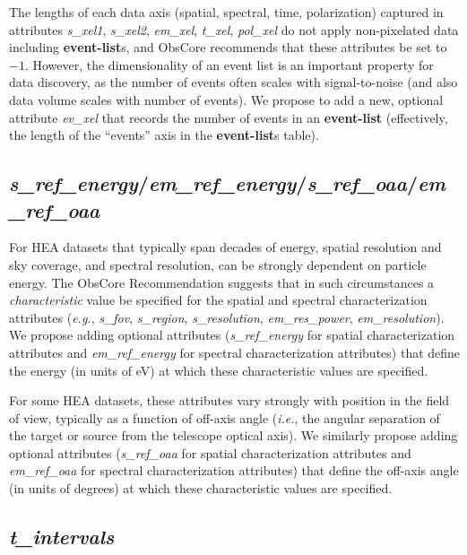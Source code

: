 \documentclass[11pt,a4paper]{ivoa}
\begin{document}
The lengths of each data axis (spatial, spectral, time, polarization) captured in attributes {\em s\_xel1\/}, {\em s\_xel2\/}, {\em em\_xel\/}, {\em t\_xel\/}, {\em pol\_xel\/} do not apply non-pixelated data including {\bf event-list}s, and ObsCore recommends that these attributes be set to $-1$.  However, the dimensionality of an event list is an important property for data discovery, as the number of events often scales with signal-to-noise (and also data volume scales with number of events).  We propose to add a new, optional attribute {\em ev\_xel\/} that records the number of events in an {\bf event-list} (effectively, the length of the ``events'' axis in the {\bf event-list}s table).

\subsection{{\em s\_ref\_energy\/}/{\em em\_ref\_energy\/}/{\em s\_ref\_oaa\/}/{\em em\_ref\_oaa}}

For \gls{HEA} datasets that typically span decades of energy, spatial resolution and sky coverage, and spectral resolution, can be strongly dependent on particle energy. The ObsCore Recommendation suggests that in such circumstances a {\em characteristic\/} value be specified for the spatial and spectral characterization attributes ({\em e.g.\/}, {\em s\_fov\/}, {\em s\_region\/}, {\em s\_resolution\/}, {\em em\_res\_power\/}, {\em em\_resolution\/}). We propose adding optional attributes ({\em s\_ref\_energy\/} for spatial characterization attributes and {\em em\_ref\_energy\/} for spectral characterization attributes) that define the energy (in units of eV) at which these characteristic values are specified.

For some \gls{HEA} datasets, these attributes vary strongly with position in the field of view, typically as a function of off-axis angle ({\em i.e.\/}, the angular separation of the target or source from the telescope optical axis). We similarly propose adding optional attributes ({\em s\_ref\_oaa\/} for spatial characterization attributes and {\em em\_ref\_oaa\/} for spectral characterization attributes) that define the off-axis angle (in units of degrees) at which these characteristic values are specified.

\subsection{{\em t\_intervals}}
\end{document}
